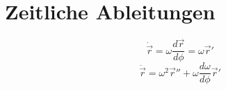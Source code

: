 \section{Zeitliche Ableitungen}
\[ \dot{\vec{r}} = \omega\frac{d\vec{r}}{d\phi} = \omega\vec{r}' \]
\[ \ddot{\vec{r}} = \omega^2\vec{r}'' + \omega\frac{d\omega}{d\phi}\vec{r}' \]
